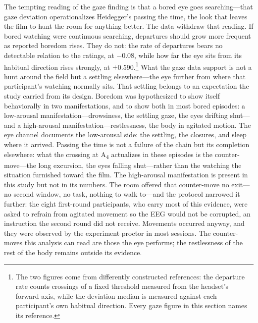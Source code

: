 The tempting reading of the gaze finding is that a bored eye goes searching---that gaze
deviation operationalizes Heidegger's passing the time, the look that leaves the film to hunt
the room for anything better. The data withdraw that reading. If bored watching were continuous
searching, departures should grow more frequent as reported boredom rises. They do not: the
rate of departures bears no detectable relation to the ratings, at $-$0.08, while how far the
eye sits from its habitual direction rises strongly, at $+$0.590.\footnote{The two figures come
from differently constructed references: the departure rate counts crossings of a fixed
threshold measured from the headset's forward axis, while the deviation median is measured
against each participant's own habitual direction. Every gaze figure in this section names its
reference.} What the gaze data support is not a hunt around the field but a settling
elsewhere---the eye further from where that participant's watching normally sits. That settling
belongs to an expectation the study carried from its design. Boredom was hypothesized to show
itself behaviorally in two manifestations, and to show both in most bored episodes: a
low-arousal manifestation---drowsiness, the settling gaze, the eyes drifting shut---and a
high-arousal manifestation---restlessness, the body in agitated motion. The eye channel
documents the low-arousal side: the settling, the closures, and sleep where it arrived. Passing
the time is not a failure of the chain but its completion elsewhere: what the crossing at
A\textsubscript{4} actualizes in these episodes is the counter-move---the long excursion, the
eyes falling shut---rather than the watching the situation furnished toward the film. The
high-arousal manifestation is present in this study but not in its numbers. The room offered
that counter-move no exit---no second window, no task, nothing to walk to---and the protocol
narrowed it further: the eight first-round participants, who carry most of this evidence, were
asked to refrain from agitated movement so the EEG would not be corrupted, an instruction the
second round did not receive. Movements occurred anyway, and they were observed by the
experiment proctor in most sessions. The counter-moves this analysis can read are those the eye
performs; the restlessness of the rest of the body remains outside its evidence.

